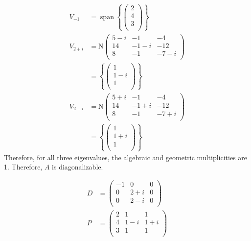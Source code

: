 \documentclass[fleqn, a4paper, draft]{amsart}
\DeclareMathOperator{\vspan}{\mathrm{span}} %
\theoremstyle{definition}
\theoremstyle{theorem}
\theoremstyle{remark}
\newcommand{\N}{\mathrm{N}}
\numberwithin{corollary}{theorem}
\numberwithin{equation}{theorem}
\begin{document}
\begin{align*}
	V_{-1} &= \vspan
		\left\lbrace 
			\begin{pmatrix}
				2\\
				4\\
				3\\
			\end{pmatrix}
		\right\rbrace\\
	V_{2 + i} &= \N
		\begin{pmatrix}
			5 - i & -1 & -4\\
			14 & -1 - i & -12\\
			8 & -1 & -7 - i\\
		\end{pmatrix}\\
	&= 
		\left\lbrace
			\begin{pmatrix}
				1\\
				1 - i\\
				1\\
			\end{pmatrix}
		\right\rbrace\\
	V_{2 - i} &= \N
		\begin{pmatrix}
			5 + i & -1 & -4\\
			14 & -1 + i & -12\\
			8 & -1 & -7 + i\\
		\end{pmatrix}\\
	&= 
		\left\lbrace
			\begin{pmatrix}
				1\\
				1 + i\\
				1\\
			\end{pmatrix}
		\right\rbrace
\end{align*}
Therefore, for all three eigenvalues, the algebraic and geometric multiplicities are 1. Therefore, $A$ is diagonalizable.

\begin{align*}
	D &= 
		\begin{pmatrix}
			-1 & 0 & 0\\
			0 & 2 + i & 0\\
			0 & 2 - i & 0\\
		\end{pmatrix}\\
	P &= 
		\begin{pmatrix}
			2 & 1 & 1\\
			4 & 1 - i & 1 + i\\
			3 & 1 & 1\\
		\end{pmatrix}
\end{align*}
\end{document}
